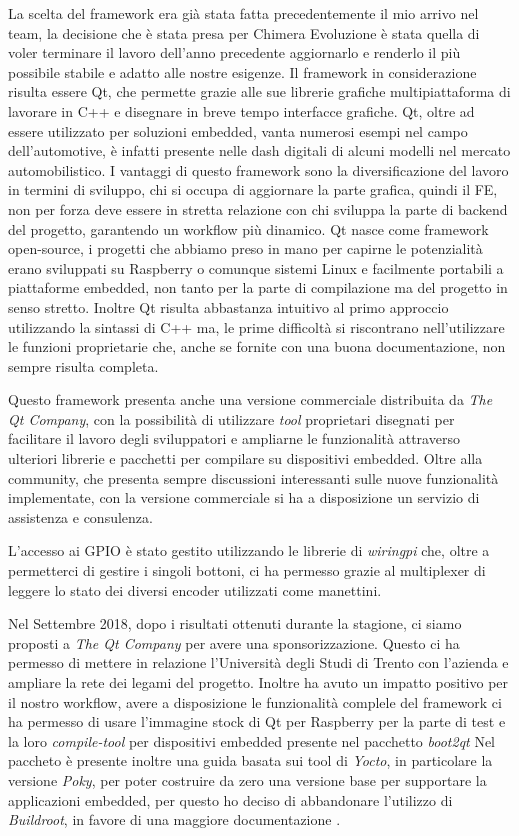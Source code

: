La scelta del framework era già stata fatta precedentemente il mio arrivo nel team, la decisione 
che è stata presa per Chimera Evoluzione è stata quella di voler terminare il lavoro dell'anno precedente 
aggiornarlo e renderlo il più possibile stabile e adatto alle nostre esigenze.
Il framework in considerazione risulta essere Qt, che permette grazie alle sue librerie grafiche 
multipiattaforma di lavorare in C++ e disegnare in breve tempo interfacce grafiche.
Qt, oltre ad essere utilizzato per soluzioni embedded, vanta numerosi esempi nel campo dell'automotive, è infatti 
presente nelle dash digitali di alcuni modelli nel mercato automobilistico.
I vantaggi di questo framework sono la diversificazione del lavoro in termini di sviluppo, chi si occupa 
di aggiornare la parte grafica, quindi il FE, non per forza deve essere in stretta relazione con chi sviluppa la parte
di backend del progetto, garantendo un workflow più dinamico. 
Qt nasce come framework open-source, i progetti che abbiamo preso in mano per capirne le potenzialità erano
sviluppati su Raspberry o comunque sistemi Linux e facilmente portabili a piattaforme embedded, non tanto per 
la parte di compilazione ma del progetto in senso stretto.
Inoltre Qt risulta abbastanza intuitivo al primo approccio utilizzando la sintassi di C++ ma, le prime difficoltà 
si riscontrano nell'utilizzare le funzioni proprietarie che, anche se fornite con una buona documentazione, non sempre
risulta completa.

Questo framework presenta anche una versione commerciale distribuita da \emph{The Qt Company}, 
con la possibilità di utilizzare \emph{tool} proprietari disegnati per facilitare il lavoro degli sviluppatori e ampliarne le funzionalità  
attraverso ulteriori librerie e pacchetti per compilare su dispositivi embedded.
Oltre alla community, che presenta sempre discussioni interessanti sulle nuove funzionalità implementate, con la versione commerciale
si ha a disposizione un servizio di assistenza e consulenza.    

L'accesso ai GPIO è stato gestito utilizzando le librerie di \emph{wiringpi} \cite{wiringPI} che, oltre a permetterci di gestire i singoli bottoni,
ci ha permesso grazie al multiplexer di leggere lo stato dei diversi encoder utilizzati come manettini. 

Nel Settembre 2018, dopo i risultati ottenuti durante la stagione, ci siamo proposti a \emph{The Qt Company} per avere una sponsorizzazione.
Questo ci ha permesso di mettere in relazione l'Università degli Studi di Trento con l'azienda e ampliare la rete dei legami del progetto.
Inoltre ha avuto un impatto positivo per il nostro workflow, avere a disposizione le funzionalità complele del framework ci ha permesso di
usare l'immagine stock di Qt per Raspberry per la parte di test e la loro \emph{compile-tool} per dispositivi embedded presente nel pacchetto \emph{boot2qt}
Nel paccheto è presente inoltre una guida basata sui tool di \emph{Yocto}, in particolare la versione \emph{Poky}, per poter costruire da zero 
una versione base per supportare la applicazioni embedded, per questo ho deciso di abbandonare l'utilizzo di \emph{Buildroot}, in favore di una maggiore 
documentazione \cite{jumpnowtek}. 
   
  
\newpage